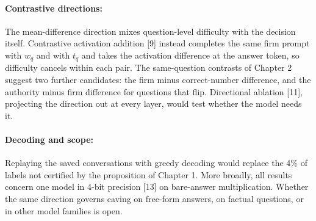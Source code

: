 \documentclass[12pt]{report}
\theoremstyle{definition}
\begin{document}
\paragraph{Contrastive directions:}
The mean-difference direction mixes question-level difficulty with the decision itself. Contrastive activation addition [9] instead completes the same firm prompt with $w_q$ and with $t_q$ and takes the activation difference at the answer token, so difficulty cancels within each pair. The same-question contrasts of Chapter 2 suggest two further candidates: the firm minus correct-number difference, and the authority minus firm difference for questions that flip. Directional ablation [11], projecting the direction out at every layer, would test whether the model needs it.

\paragraph{Decoding and scope:}
Replaying the saved conversations with greedy decoding would replace the 4\% of labels not certified by the proposition of Chapter 1. More broadly, all results concern one model in 4-bit precision [13] on bare-answer multiplication. Whether the same direction governs caving on free-form answers, on factual questions, or in other model families is open.
\end{document}
